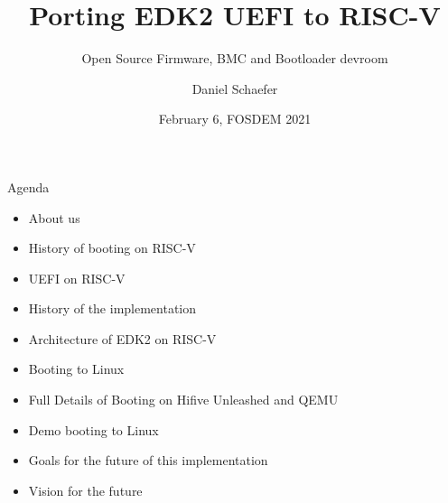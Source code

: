 \documentclass[
  10pt
]{beamer}
\title{Porting EDK2 UEFI to RISC-V}
\subtitle{Open Source Firmware, BMC and Bootloader devroom}
\date{February 6, FOSDEM 2021}
\author{Daniel Schaefer}
\begin{document}
\maketitle

\begin{frame}{Agenda}
  \begin{itemize}
    \item About us
    \item History of booting on RISC-V
    \item UEFI on RISC-V
    \item History of the implementation
    \item Architecture of EDK2 on RISC-V
    \item Booting to Linux
    \item Full Details of Booting on Hifive Unleashed and QEMU
    \item Demo booting to Linux
    \item Goals for the future of this implementation
    \item Vision for the future
  \end{itemize}
\end{frame}
\end{document}
